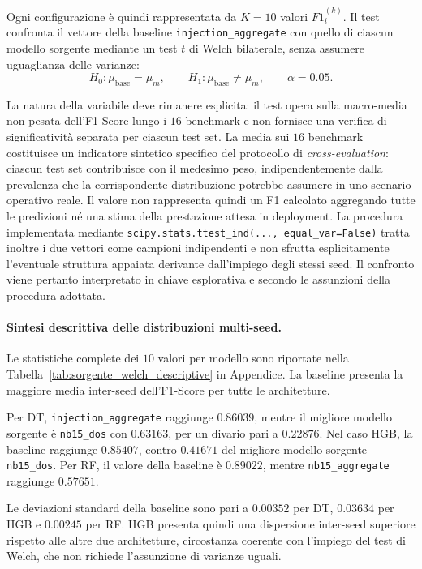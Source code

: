 Ogni configurazione è quindi rappresentata da $K=10$ valori $\overline{F1}_{i}^{(k)}$. 
Il test confronta il vettore della baseline \texttt{injection\_aggregate} con quello di ciascun modello sorgente mediante un test $t$ di Welch bilaterale, senza assumere uguaglianza delle varianze:
\[
    H_0:\mu_{\mathrm{base}}=\mu_m,
    \qquad
    H_1:\mu_{\mathrm{base}}\neq\mu_m,
    \qquad
    \alpha=0.05.
\]

La natura della variabile deve rimanere esplicita: il test opera sulla macro-media non pesata dell'F1-Score lungo i $16$ benchmark e non fornisce una verifica di significatività separata per ciascun test set.
La media sui $16$ benchmark costituisce un indicatore sintetico specifico del protocollo di \textit{cross-evaluation}: ciascun test set contribuisce con il medesimo peso, indipendentemente dalla prevalenza che la corrispondente distribuzione potrebbe assumere in uno scenario operativo reale. Il valore non rappresenta quindi un F1 calcolato aggregando tutte le predizioni né una stima della prestazione attesa in deployment.
La procedura implementata mediante \texttt{scipy.stats.ttest\_ind(..., equal\_var=False)} tratta inoltre i due vettori come campioni indipendenti e non sfrutta esplicitamente l'eventuale struttura appaiata derivante dall'impiego degli stessi seed. Il confronto viene pertanto interpretato in chiave esplorativa e secondo le assunzioni della procedura adottata.

\paragraph{Sintesi descrittiva delle distribuzioni multi-seed.}
Le statistiche complete dei $10$ valori per modello sono riportate nella Tabella~\ref{tab:sorgente_welch_descriptive} in Appendice. 
La baseline presenta la maggiore media inter-seed dell'F1-Score per tutte le architetture.

Per DT, \texttt{injection\_aggregate} raggiunge $0.86039$, mentre il migliore modello sorgente è \texttt{nb15\_dos} con $0.63163$, per un divario pari a $0.22876$. 
Nel caso HGB, la baseline raggiunge $0.85407$, contro $0.41671$ del migliore modello sorgente \texttt{nb15\_dos}. 
Per RF, il valore della baseline è $0.89022$, mentre \texttt{nb15\_aggregate} raggiunge $0.57651$.

Le deviazioni standard della baseline sono pari a $0.00352$ per DT, $0.03634$ per HGB e $0.00245$ per RF. 
HGB presenta quindi una dispersione inter-seed superiore rispetto alle altre due architetture, circostanza coerente con l'impiego del test di Welch, che non richiede l'assunzione di varianze uguali.

